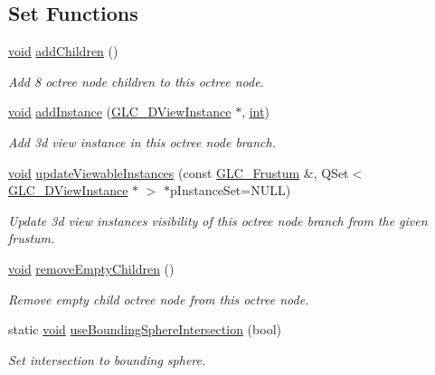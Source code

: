 \subsection*{Set Functions}
\begin{DoxyCompactItemize}
\item 
\hyperlink{group___u_a_v_objects_plugin_ga444cf2ff3f0ecbe028adce838d373f5c}{void} \hyperlink{class_g_l_c___octree_node_a67d1cbcd7012811f3436eb634d29469d}{add\-Children} ()
\begin{DoxyCompactList}\small\item\em Add 8 octree node children to this octree node. \end{DoxyCompactList}\item 
\hyperlink{group___u_a_v_objects_plugin_ga444cf2ff3f0ecbe028adce838d373f5c}{void} \hyperlink{class_g_l_c___octree_node_aff565752a7aca239370312357c1b7b4a}{add\-Instance} (\hyperlink{class_g_l_c__3_d_view_instance}{G\-L\-C\-\_\-D\-View\-Instance} $\ast$, \hyperlink{ioapi_8h_a787fa3cf048117ba7123753c1e74fcd6}{int})
\begin{DoxyCompactList}\small\item\em Add 3d view instance in this octree node branch. \end{DoxyCompactList}\item 
\hyperlink{group___u_a_v_objects_plugin_ga444cf2ff3f0ecbe028adce838d373f5c}{void} \hyperlink{class_g_l_c___octree_node_a08ae8b9af2ba4a4b743e5203cfbf80a8}{update\-Viewable\-Instances} (const \hyperlink{class_g_l_c___frustum}{G\-L\-C\-\_\-\-Frustum} \&, Q\-Set$<$ \hyperlink{class_g_l_c__3_d_view_instance}{G\-L\-C\-\_\-D\-View\-Instance} $\ast$ $>$ $\ast$p\-Instance\-Set=N\-U\-L\-L)
\begin{DoxyCompactList}\small\item\em Update 3d view instances visibility of this octree node branch from the given frustum. \end{DoxyCompactList}\item 
\hyperlink{group___u_a_v_objects_plugin_ga444cf2ff3f0ecbe028adce838d373f5c}{void} \hyperlink{class_g_l_c___octree_node_a7b572715b34eaf32db468b0669872469}{remove\-Empty\-Children} ()
\begin{DoxyCompactList}\small\item\em Remove empty child octree node from this octree node. \end{DoxyCompactList}\item 
static \hyperlink{group___u_a_v_objects_plugin_ga444cf2ff3f0ecbe028adce838d373f5c}{void} \hyperlink{class_g_l_c___octree_node_a41c19cc2061b7d924083aac8727071bf}{use\-Bounding\-Sphere\-Intersection} (bool)
\begin{DoxyCompactList}\small\item\em Set intersection to bounding sphere. \end{DoxyCompactList}\end{DoxyCompactItemize}


